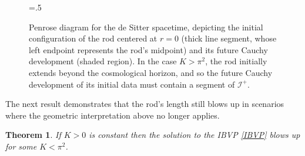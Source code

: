 \documentclass[10pt]{amsart}
\newtheorem{Thm}{Theorem}[section]
\begin{document}
\begin{figure}[h!]
\begin{center}
\epsfxsize=.5\textwidth
\leavevmode
{}
\end{center}
\caption{Penrose diagram for the de Sitter spacetime, depicting the initial configuration of the rod centered at $r=0$ (thick line segment, whose left endpoint represents the rod's midpoint) and its future Cauchy development (shaded region). In the case $K > \pi^2$, the rod initially extends beyond the cosmological horizon, and so the future Cauchy development of its initial data must contain a segment of $\mathscr{I^+}$.} \label{Pen_dS}
\end{figure}

The next result demonstrates that the rod’s length still blows up in scenarios where the geometric interpretation above no longer applies.

\begin{Thm} \label{constantcurvature}
If $K>0$ is constant then the solution to the IBVP \eqref{IBVP} blows up for some $K < \pi^2$.
\end{Thm}
\end{document}

